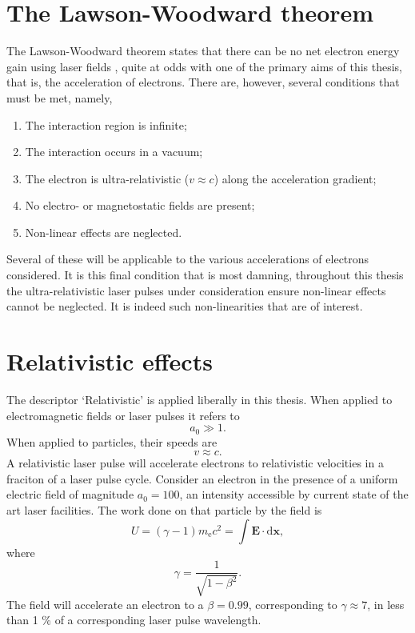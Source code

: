 \section{The Lawson-Woodward theorem}\label{sec:intro-lawson_woodward}
The Lawson-Woodward theorem states that there can be no net electron energy gain using laser fields \cite{esareyPhysicsLaserdrivenPlasmabased2009}, quite at odds with one of the primary aims of this thesis, that is, the acceleration of electrons. There are, however, several conditions that must be met, namely,
\begin{enumerate}
	\item The interaction region is infinite;
	\item The interaction  occurs in a vacuum;
	\item The electron is ultra-relativistic ($v\approx c$) along the acceleration gradient;
	\item No electro- or magnetostatic fields are present;
	\item Non-linear effects are neglected.
\end{enumerate}
Several of these will be applicable to the various accelerations of electrons considered. It is this final condition that is most damning, throughout this thesis the ultra-relativistic laser pulses under consideration ensure non-linear effects cannot be neglected. It is indeed such non-linearities that are of interest.

\section{Relativistic effects}
The descriptor `Relativistic' is applied liberally in this thesis. When applied to electromagnetic fields or laser pulses it refers to 
\begin{equation}
	a_0 \gg 1.
\end{equation}
When applied to particles, their speeds are
\begin{equation}
	v \approx c.
\end{equation}
A relativistic laser pulse will accelerate electrons to relativistic velocities in a fraciton of a laser pulse cycle. Consider an electron in the presence of a uniform electric field of magnitude $a_0 = 100$, an intensity accessible by current state of the art laser facilities. The work done on that particle by the field is 
\begin{equation}
	U = (\gamma -1)m_\mathrm{e}c^2 = \int \mathbf{E}\cdot \mathrm{d} \mathbf{x},
\end{equation}
where 
\begin{equation}
	\gamma = \frac{1}{\sqrt{1-\beta^2}}.
\end{equation}
The field will accelerate an electron to a $\beta = 0.99$, corresponding to $\gamma \approx 7$, in less than 1 \% of a corresponding laser pulse wavelength.

